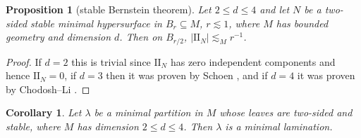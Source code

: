 \documentclass[reqno,10pt]{amsart}
\newcommand{\Two}{\mathrm{I\!I}}
\newtheorem{proposition}[theorem]{Proposition}
\newtheorem{corollary}[theorem]{Corollary}
\theoremstyle{definition}
\numberwithin{equation}{section}
\begin{document}
\begin{proposition}[stable Bernstein theorem]
Let $2 \leq d \leq 4$ and let $N$ be a two-sided stable minimal hypersurface in $B_r \subseteq M$, $r \lesssim 1$, where $M$ has bounded geometry and dimension $d$.
Then on $B_{r/2}$, $|\Two_N| \lesssim_M r^{-1}$.
\end{proposition}
\begin{proof}
If $d = 2$ this is trivial since $\Two_N$ has zero independent components and hence $\Two_N = 0$, if $d = 3$ then it was proven by Schoen \cite[Corollary 2.11]{colding2011course}, and if $d = 4$ it was proven by Chodosh--Li \cite{Chodosh2021}.
\end{proof}

\begin{corollary}
Let $\lambda$ be a minimal partition in $M$ whose leaves are two-sided and stable, where $M$ has dimension $2 \leq d \leq 4$.
Then $\lambda$ is a minimal lamination.
\end{corollary}


\printbibliography
\end{document}
